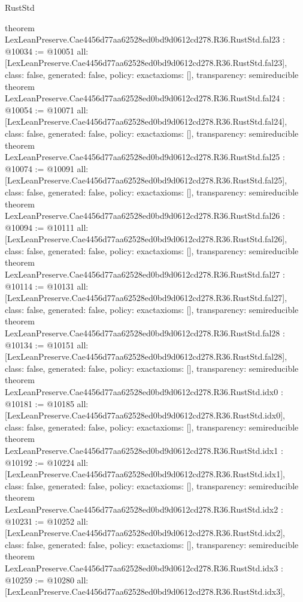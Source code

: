 \begin{lexlean}{RustStd}
\begin{coremodule}
{}
theorem LexLeanPreserve.Cae4456d77aa62528ed0bd9d0612cd278.R36.RustStd.fal23 : @10034 := @10051 {
  all: [LexLeanPreserve.Cae4456d77aa62528ed0bd9d0612cd278.R36.RustStd.fal23],
  class: false,
  generated: false,
  policy: exact{axioms: []},
  transparency: semireducible
}
theorem LexLeanPreserve.Cae4456d77aa62528ed0bd9d0612cd278.R36.RustStd.fal24 : @10054 := @10071 {
  all: [LexLeanPreserve.Cae4456d77aa62528ed0bd9d0612cd278.R36.RustStd.fal24],
  class: false,
  generated: false,
  policy: exact{axioms: []},
  transparency: semireducible
}
theorem LexLeanPreserve.Cae4456d77aa62528ed0bd9d0612cd278.R36.RustStd.fal25 : @10074 := @10091 {
  all: [LexLeanPreserve.Cae4456d77aa62528ed0bd9d0612cd278.R36.RustStd.fal25],
  class: false,
  generated: false,
  policy: exact{axioms: []},
  transparency: semireducible
}
theorem LexLeanPreserve.Cae4456d77aa62528ed0bd9d0612cd278.R36.RustStd.fal26 : @10094 := @10111 {
  all: [LexLeanPreserve.Cae4456d77aa62528ed0bd9d0612cd278.R36.RustStd.fal26],
  class: false,
  generated: false,
  policy: exact{axioms: []},
  transparency: semireducible
}
theorem LexLeanPreserve.Cae4456d77aa62528ed0bd9d0612cd278.R36.RustStd.fal27 : @10114 := @10131 {
  all: [LexLeanPreserve.Cae4456d77aa62528ed0bd9d0612cd278.R36.RustStd.fal27],
  class: false,
  generated: false,
  policy: exact{axioms: []},
  transparency: semireducible
}
theorem LexLeanPreserve.Cae4456d77aa62528ed0bd9d0612cd278.R36.RustStd.fal28 : @10134 := @10151 {
  all: [LexLeanPreserve.Cae4456d77aa62528ed0bd9d0612cd278.R36.RustStd.fal28],
  class: false,
  generated: false,
  policy: exact{axioms: []},
  transparency: semireducible
}
theorem LexLeanPreserve.Cae4456d77aa62528ed0bd9d0612cd278.R36.RustStd.idx0 : @10181 := @10185 {
  all: [LexLeanPreserve.Cae4456d77aa62528ed0bd9d0612cd278.R36.RustStd.idx0],
  class: false,
  generated: false,
  policy: exact{axioms: []},
  transparency: semireducible
}
theorem LexLeanPreserve.Cae4456d77aa62528ed0bd9d0612cd278.R36.RustStd.idx1 : @10192 := @10224 {
  all: [LexLeanPreserve.Cae4456d77aa62528ed0bd9d0612cd278.R36.RustStd.idx1],
  class: false,
  generated: false,
  policy: exact{axioms: []},
  transparency: semireducible
}
theorem LexLeanPreserve.Cae4456d77aa62528ed0bd9d0612cd278.R36.RustStd.idx2 : @10231 := @10252 {
  all: [LexLeanPreserve.Cae4456d77aa62528ed0bd9d0612cd278.R36.RustStd.idx2],
  class: false,
  generated: false,
  policy: exact{axioms: []},
  transparency: semireducible
}
theorem LexLeanPreserve.Cae4456d77aa62528ed0bd9d0612cd278.R36.RustStd.idx3 : @10259 := @10280 {
  all: [LexLeanPreserve.Cae4456d77aa62528ed0bd9d0612cd278.R36.RustStd.idx3],
}
\end{coremodule}
\end{lexlean}
